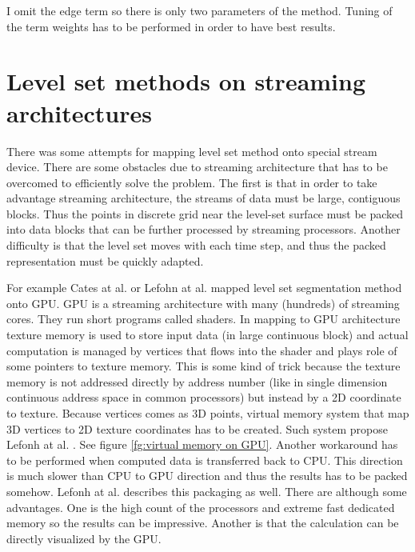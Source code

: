 I omit the edge term so there is only two parameters of the method.
Tuning of the term weights has to be performed in order to have best results.

\section{Level set methods on streaming architectures}

\par
There was some attempts for mapping level set method onto special stream device.
There are some obstacles due to streaming architecture that has to be overcomed to efficiently solve the problem.
The first is that in order to take advantage streaming architecture, the streams of data must be large, contiguous blocks.
Thus the points in discrete grid near the level-set surface must be packed into data blocks that can be further processed by streaming processors.
Another difficulty is that the level set moves with each time step, and thus the packed representation must be quickly adapted.

\par
For example Cates at al. \cite{GIST} or Lefohn at al. \cite{lefonhGPUSolver} mapped level set segmentation method onto GPU.
GPU is a streaming architecture with many (hundreds) of streaming cores. They run short programs called shaders.
In mapping to GPU architecture texture memory is used to store input data (in large continuous block) and actual computation is managed by vertices that flows into the shader and plays role of some pointers to texture memory.
This is some kind of trick because the texture memory is not addressed directly by address number (like in single dimension continuous address space in common processors) but instead by a 2D coordinate to texture.
Because vertices comes as 3D points, virtual memory system that map 3D vertices to 2D texture coordinates has to be created.
Such system propose Lefonh at al. \cite{lefonhGPUSolver}. See figure \ref{fg:virtual memory on GPU}.
Another workaround has to be performed when computed data is transferred back to CPU.
This direction is much slower than CPU to GPU direction and thus the results has to be packed somehow.
Lefonh at al. \cite{lefonhGPUSolver} describes this packaging as well.
There are although some advantages.
One is the high count of the processors and extreme fast dedicated memory so the results can be impressive.
Another is that the calculation can be directly visualized by the GPU.

